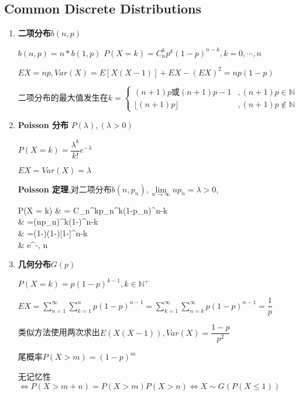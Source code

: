 \subsection{Common Discrete Distributions}
\begin{enumerate}
	\item \textbf{二项分布}$ b(n,p)$

		$	b(n,p)  = n * b(1,p)$
		$ P(X = k) = C_n^kp^k(1-p)^{n-k}, k = 0,\cdots,n$

		$ EX = np, Var(X) = E[X(X-1)]+EX-(EX)^2 = np(1-p)$

	二项分布的最大值发生在$ k = \left \{ \begin{matrix}
			(n+1)p 或 (n+1)p - 1 &, (n+1)p \in \mathbb{N} \\
			\lfloor(n+1)p\rfloor&,  (n+1)p \not \in \mathbb{N}
		\end{matrix}\right.$

	\item \textbf{Poisson 分布} $ P(\lambda),(\lambda > 0)$

		$ P(X = k) = \dfrac{\lambda^k}{k!}e^{-\lambda}$

		$ EX = Var(X) = \lambda$

		\textbf{Poisson 定理},对二项分布$ b(n,p_n),\lim \limits_{n\to \infty} np_n = \lambda > 0$,
		\begin{flalign*}
			P(X = k) & = C_n^kp_n^k(1-p_n)^{n-k}                                                                                \\
						   & =(np_n)^k(1-)^{n-k}                                     \\
						& =(1-)\cdots(1-)[1-]^{n-k} \\
					 & \rightarrow {}e^{-\lambda}, n\to \infty
		\end{flalign*}

	\item \textbf{几何分布}$ G(p)$

		$ P(X=k) = p(1-p)^{k-1}, k \in \mathbb{N^+}$

		$ EX = \sum_{n=1}^{\infty}\sum_{k=1}^{n}{p(1-p)^{n-1}}=
		\sum_{k=1}^{\infty}\sum_{n=k}^{\infty}{p(1-p)^{n-1}}= \dfrac{1}{p}$

		类似方法使用两次求出$ E(X(X-1)),Var(X) = \dfrac{1-p}{p^2}$

		尾概率$ P(X>m) = (1-p)^m$

		无记忆性 $\Leftrightarrow P(X>m+n) = P(X>m)P(X>n)\Leftrightarrow X\sim G(P(X\le 1)) $


\end{enumerate}
